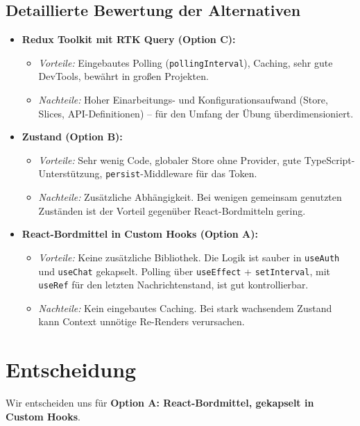 \documentclass[a4paper,11pt]{article}
\newcommand{\code}[1]{\colorbox{codebg}{\texttt{\small #1}}}
\begin{document}
\subsection*{Detaillierte Bewertung der Alternativen}
\begin{itemize}
    \item \textbf{Redux Toolkit mit RTK Query (Option C):}
    \begin{itemize}
        \item \textit{Vorteile:} Eingebautes Polling
              (\code{pollingInterval}), Caching, sehr gute DevTools,
              bewährt in großen Projekten.
        \item \textit{Nachteile:} Hoher Einarbeitungs- und
              Konfigurationsaufwand (Store, Slices, API-Definitionen) -- für
              den Umfang der Übung überdimensioniert.
    \end{itemize}
    \item \textbf{Zustand (Option B):}
    \begin{itemize}
        \item \textit{Vorteile:} Sehr wenig Code, globaler Store ohne
              Provider, gute TypeScript-Unterstützung,
              \code{persist}-Middleware für das Token.
        \item \textit{Nachteile:} Zusätzliche Abhängigkeit. Bei wenigen
              gemeinsam genutzten Zuständen ist der Vorteil gegenüber
              React-Bordmitteln gering.
    \end{itemize}
    \item \textbf{React-Bordmittel in Custom Hooks (Option A):}
    \begin{itemize}
        \item \textit{Vorteile:} Keine zusätzliche Bibliothek. Die Logik ist
              sauber in \code{useAuth} und \code{useChat} gekapselt. Polling
              über \code{useEffect} + \code{setInterval}, mit \code{useRef}
              für den letzten Nachrichtenstand, ist gut kontrollierbar.
        \item \textit{Nachteile:} Kein eingebautes Caching. Bei stark
              wachsendem Zustand kann Context unnötige Re-Renders verursachen.
    \end{itemize}
\end{itemize}

\section{Entscheidung}
\begin{entscheidung}
Wir entscheiden uns für \textbf{Option A: React-Bordmittel, gekapselt in
Custom Hooks}.
\end{entscheidung}
\end{document}
